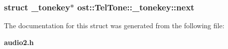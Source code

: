 \subsubsection[{next}]{\setlength{\rightskip}{0pt plus 5cm}struct {\bf \_\-tonekey}$\ast$ {\bf ost::TelTone::\_\-tonekey::next}\hspace{0.3cm}{\ttfamily  [read]}}\label{structost_1_1_tel_tone_1_1__tonekey_a759b5eb70b376b42328b205e154c3a88}


The documentation for this struct was generated from the following file:\begin{DoxyCompactItemize}
\item 
{\bf audio2.h}\end{DoxyCompactItemize}
